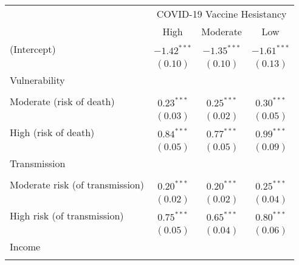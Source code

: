 
\begin{table}
\begin{center}
\begin{scriptsize}
\begin{tabular}{l c c c}
\hline
 & \multicolumn{3}{c}{COVID-19 Vaccine Hesistancy} \\
\cline{2-4}
 & High & Moderate & Low \\
\hline
(Intercept)                                     & $-1.42^{***}$ & $-1.35^{***}$ & $-1.61^{***}$ \\
                                                & $(0.10)$      & $(0.10)$      & $(0.13)$      \\
Vulnerability                                   &               &               &               \\
                                                &               &               &               \\
\quad Moderate (risk of death)                  & $0.23^{***}$  & $0.25^{***}$  & $0.30^{***}$  \\
                                                & $(0.03)$      & $(0.02)$      & $(0.05)$      \\
\quad High (risk of death)                      & $0.84^{***}$  & $0.77^{***}$  & $0.99^{***}$  \\
                                                & $(0.05)$      & $(0.05)$      & $(0.09)$      \\
Transmission                                    &               &               &               \\
                                                &               &               &               \\
\quad Moderate risk (of transmission)           & $0.20^{***}$  & $0.20^{***}$  & $0.25^{***}$  \\
                                                & $(0.02)$      & $(0.02)$      & $(0.04)$      \\
\quad High risk (of transmission)               & $0.75^{***}$  & $0.65^{***}$  & $0.80^{***}$  \\
                                                & $(0.05)$      & $(0.04)$      & $(0.06)$      \\
Income                                          &               &               &               \\
                                                &               &               &               \\

\end{tabular}
\end{scriptsize}
\end{center}
\end{table}
